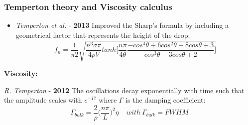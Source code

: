 \documentclass[xcolor=table]{beamer}
\begin{document}
\begin{frame}

\frametitle{ Temperton theory and Viscosity calculus}

\fontsize{10}{11.2} \selectfont
	\begin{itemize}
	\item \textit{Temperton et al.} - \textbf{2013} Improved the Sharp's formula by including a geometrical factor that represents the height of the drop:
	\begin{equation}
	f_n=\frac{1}{\pi 2}\sqrt{\frac{n^3\sigma\pi}{4\rho V}tanh\bigg[\frac{n\pi}{4\theta}\frac{-cos^4\theta+6cos^2\theta-8cos\theta+3}{cos^3\theta-3cos\theta+2}\bigg]}
	\end{equation}
\end{itemize}

\textbf{Viscosity:}

\textit{R. Temperton} - \textbf{2012} The oscillations decay exponentially with time such that the amplitude scales with $e^{-\Gamma t}$ where $\Gamma$ is the damping coefficient:
\begin{equation}
\Gamma_{bulk} = \frac{2}{\rho}\bigg(\frac{n\pi}{L}\bigg)^2\eta \ \ \ \ \ with\ \Gamma_{bulk}=FWHM
\end{equation}

\end{frame}
\end{document}
